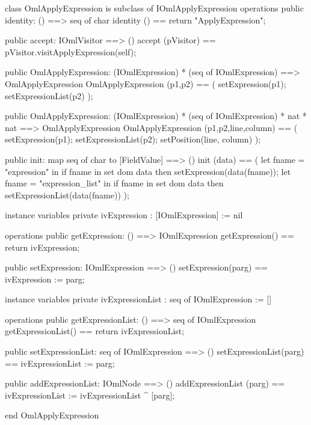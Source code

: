 \begin{vdm_al}
class OmlApplyExpression is subclass of IOmlApplyExpression
operations
  public identity: () ==> seq of char
  identity () == return "ApplyExpression";

  public accept: IOmlVisitor ==> ()
  accept (pVisitor) == pVisitor.visitApplyExpression(self);

  public OmlApplyExpression:
    (IOmlExpression) *
    (seq of IOmlExpression) ==> OmlApplyExpression
  OmlApplyExpression (p1,p2) == 
    ( setExpression(p1);
      setExpressionList(p2) );

  public OmlApplyExpression:
    (IOmlExpression) *
    (seq of IOmlExpression) *
    nat *
    nat ==> OmlApplyExpression
  OmlApplyExpression (p1,p2,line,column) == 
    ( setExpression(p1);
      setExpressionList(p2);
      setPosition(line, column) );

  public init: map seq of char to [FieldValue] ==> ()
  init (data) ==
    ( let fname = "expression" in
        if fname in set dom data
        then setExpression(data(fname));
      let fname = "expression_list" in
        if fname in set dom data
        then setExpressionList(data(fname)) );

instance variables
  private ivExpression : [IOmlExpression] := nil

operations
  public getExpression: () ==> IOmlExpression
  getExpression() == return ivExpression;

  public setExpression: IOmlExpression ==> ()
  setExpression(parg) == ivExpression := parg;

instance variables
  private ivExpressionList : seq of IOmlExpression := []

operations
  public getExpressionList: () ==> seq of IOmlExpression
  getExpressionList() == return ivExpressionList;

  public setExpressionList: seq of IOmlExpression ==> ()
  setExpressionList(parg) == ivExpressionList := parg;

  public addExpressionList: IOmlNode ==> ()
  addExpressionList (parg) == ivExpressionList := ivExpressionList ^ [parg];

end OmlApplyExpression
\end{vdm_al}

